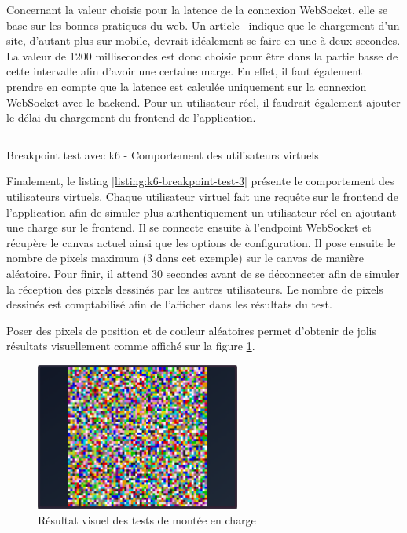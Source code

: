 Concernant la valeur choisie pour la latence de la connexion WebSocket, elle se base sur les bonnes pratiques du web. Un article~\cite{how-fast-should-a-website-load-in-2023} indique que le chargement d'un site, d'autant plus sur mobile, devrait idéalement se faire en une à deux secondes. La valeur de 1200 millisecondes est donc choisie pour être dans la partie basse de cette intervalle afin d'avoir une certaine marge. En effet, il faut également prendre en compte que la latence est calculée uniquement sur la connexion WebSocket avec le backend. Pour un utilisateur réel, il faudrait également ajouter le délai du chargement du frontend de l'application.

\begin{listing}[H]
  \inputminted[linenos]{ts}{assets/figures/breakpoint-test-3.ts}
  \caption{Breakpoint test avec k6 - Comportement des utilisateurs virtuels}
  \label{listing:k6-breakpoint-test-3}
\end{listing}

Finalement, le listing \ref{listing:k6-breakpoint-test-3} présente le comportement des utilisateurs virtuels. Chaque utilisateur virtuel fait une requête sur le frontend de l'application afin de simuler plus authentiquement un utilisateur réel en ajoutant une charge sur le frontend. Il se connecte ensuite à l'endpoint WebSocket et récupère le canvas actuel ainsi que les options de configuration. Il pose ensuite le nombre de pixels maximum (3 dans cet exemple) sur le canvas de manière aléatoire. Pour finir, il attend 30 secondes avant de se déconnecter afin de simuler la réception des pixels dessinés par les autres utilisateurs. Le nombre de pixels dessinés est comptabilisé afin de l'afficher dans les résultats du test.

Poser des pixels de position et de couleur aléatoires permet d'obtenir de jolis résultats visuellement comme affiché sur la figure \ref{fig:load-test-result}.

\begin{figure}[H]
  \centering
  \includegraphics[width=0.6\textwidth]{assets/figures/load-test-result.png}
  \caption{Résultat visuel des tests de montée en charge}
  \label{fig:load-test-result}
\end{figure}

